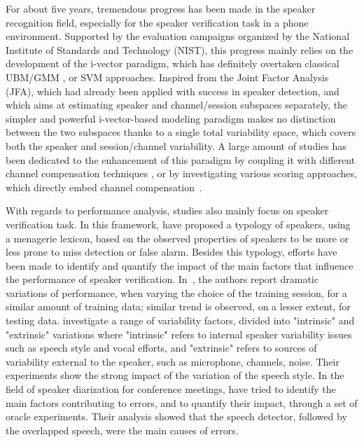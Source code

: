 For about five years, tremendous progress has been made in the speaker recognition field, especially for the speaker verification task in a phone environment. Supported by the evaluation campaigns organized by the National Institute of Standards and Technology (NIST)\cite{greenberg2013,greenberg2014}, this progress mainly relies on the development of the i-vector paradigm, which has definitely overtaken classical UBM/GMM \cite{bimbot2004}, or SVM \cite{wan2000} approaches. Inspired from the Joint Factor Analysis (JFA), which had already been applied with success in speaker detection, and which aims at estimating speaker and channel/session subspaces separately, the simpler and powerful i-vector-based modeling paradigm \cite{dehak2011} makes no distinction between the two subspaces thanks to a single total variability space, which covers both the speaker and session/channel variability. A large amount of studies has been dedicated to the enhancement of this paradigm by coupling it with different channel compensation techniques \cite{dehak2011,bousquet2012,kanagasundaram2014}, or by investigating various scoring approaches, which directly embed channel compensation~\cite{kenny2010,dehak2011,garcia2011,jiang2012,bousquet2014}. 

With regards to performance analysis, studies also mainly focus on speaker verification task.  In this framework, \cite{doddington98} have proposed a typology of speakers, using a menagerie lexicon, based on the observed properties of speakers to be more or less prone to miss detection or false alarm. Besides this typology, efforts have been made to identify and quantify the impact of the main factors that influence the performance of speaker verification. In~\cite{kahn10}, the authors report dramatic variations of performance, when varying the choice of the training session, for a similar amount of training data; similar trend is observed, on a lesser extent, for testing data.  \cite{BESTanalysis} investigate a range of variability factors, divided into "intrinsic" and "extrinsic" variations where "intrinsic" refers to internal speaker variability issues such as speech style and vocal efforts, and "extrinsic" refers to sources of variability external to the speaker, such as microphone, channels, noise. Their experiments show the strong impact of the variation of the speech style.
In the field of speaker diarization for conference meetings, \cite{Huijbregts07theblame} have  tried to identify the main factors contributing to errors, and to quantify their impact, through a set of oracle experiments. Their analysis showed that the speech detector, followed by the overlapped speech, were the main causes of errors.

